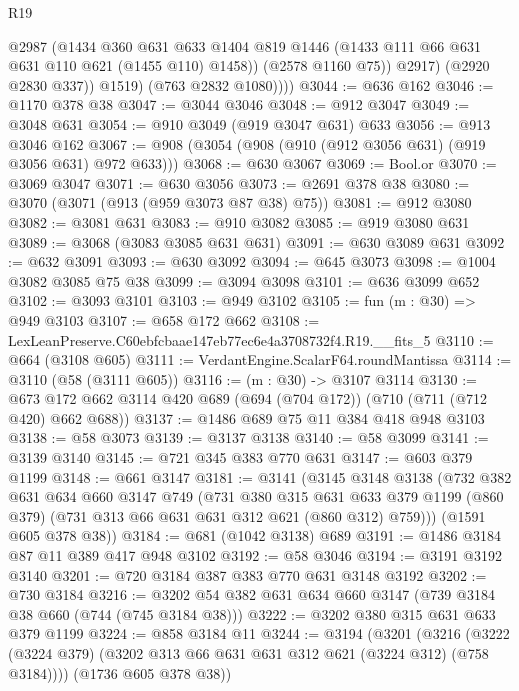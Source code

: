 \begin{lexlean}{R19}
\begin{coremodule}
                  @2987
                  (@1434
                    @360
                    @631
                    @633
                    @1404
                    @819
                    @1446
                    (@1433 @111 @66 @631 @631 @110 @621 (@1455 @110) @1458))
                  (@2578 @1160 @75))
                @2917)
              (@2920 @2830 @337))
            @1519)
          (@763 @2832 @1080))))
@3044 := @636 @162
@3046 := @1170 @378 @38
@3047 := @3044 @3046
@3048 := @912 @3047
@3049 := @3048 @631
@3054 := @910 @3049 (@919 @3047 @631) @633
@3056 := @913 @3046 @162
@3067 := @908 (@3054 (@908 (@910 (@912 @3056 @631) (@919 @3056 @631) @972 @633)))
@3068 := @630 @3067
@3069 := Bool.or
@3070 := @3069 @3047
@3071 := @630 @3056
@3073 := @2691 @378 @38
@3080 := @3070 (@3071 (@913 (@959 @3073 @87 @38) @75))
@3081 := @912 @3080
@3082 := @3081 @631
@3083 := @910 @3082
@3085 := @919 @3080 @631
@3089 := @3068 (@3083 @3085 @631 @631)
@3091 := @630 @3089 @631
@3092 := @632 @3091
@3093 := @630 @3092
@3094 := @645 @3073
@3098 := @1004 @3082 @3085 @75 @38
@3099 := @3094 @3098
@3101 := @636 @3099 @652
@3102 := @3093 @3101
@3103 := @949 @3102
@3105 := fun (m : @30) => @949 @3103
@3107 := @658 @172 @662
@3108 := LexLeanPreserve.C60ebfcbaae147eb77ec6e4a3708732f4.R19.__fits_5
@3110 := @664 (@3108 @605)
@3111 := VerdantEngine.ScalarF64.roundMantissa
@3114 := @3110 (@58 (@3111 @605))
@3116 := (m : @30) -> @3107 @3114
@3130 := @673 @172 @662 @3114 @420 @689 (@694 (@704 @172)) (@710 (@711 (@712 @420) @662 @688))
@3137 := @1486 @689 @75 @11 @384 @418 @948 @3103
@3138 := @58 @3073
@3139 := @3137 @3138
@3140 := @58 @3099
@3141 := @3139 @3140
@3145 := @721 @345 @383 @770 @631
@3147 := @603 @379 @1199
@3148 := @661 @3147
@3181 := @3141
    (@3145
      @3148
      @3138
      (@732
        @382
        @631
        @634
        @660
        @3147
        @749
        (@731
          @380
          @315
          @631
          @633
          @379
          @1199
          (@860 @379)
          (@731 @313 @66 @631 @631 @312 @621 (@860 @312) @759)))
      (@1591 @605 @378 @38))
@3184 := @681 (@1042 @3138) @689
@3191 := @1486 @3184 @87 @11 @389 @417 @948 @3102
@3192 := @58 @3046
@3194 := @3191 @3192 @3140
@3201 := @720 @3184 @387 @383 @770 @631 @3148 @3192
@3202 := @730 @3184
@3216 := @3202 @54 @382 @631 @634 @660 @3147 (@739 @3184 @38 @660 (@744 (@745 @3184 @38)))
@3222 := @3202 @380 @315 @631 @633 @379 @1199
@3224 := @858 @3184 @11
@3244 := @3194
    (@3201
      (@3216 (@3222 (@3224 @379) (@3202 @313 @66 @631 @631 @312 @621 (@3224 @312) (@758 @3184))))
      (@1736 @605 @378 @38))

\end{coremodule}
\end{lexlean}
